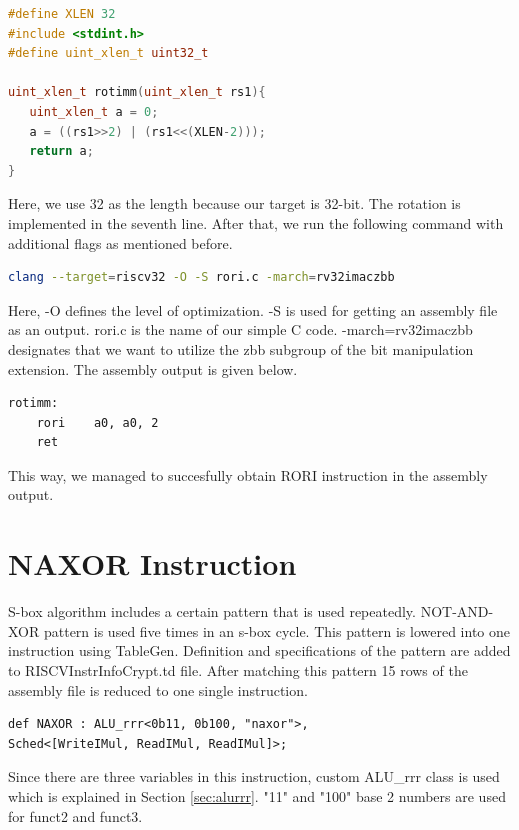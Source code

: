\begin{lstlisting}[language=C++]
#define XLEN 32
#include <stdint.h>
#define uint_xlen_t uint32_t

uint_xlen_t rotimm(uint_xlen_t rs1){
   uint_xlen_t a = 0;
   a = ((rs1>>2) | (rs1<<(XLEN-2)));
   return a;
}
\end{lstlisting}

Here, we use 32 as the length because our target is 32-bit. The rotation is implemented in the seventh line. After that, we run the following command with additional flags as mentioned before.

\begin{lstlisting}[language=Bash]
clang --target=riscv32 -O -S rori.c -march=rv32imaczbb
\end{lstlisting}

Here, -O defines the level of optimization. -S is used for getting an assembly file as an output. rori.c is the name of our simple C code. -march=rv32imaczbb designates that we want to utilize the zbb subgroup of the bit manipulation extension. The assembly output is given below.%

\begin{lstlisting}
rotimm:
	rori	a0, a0, 2
	ret
\end{lstlisting}

This way, we managed to succesfully obtain RORI instruction in the assembly output.

\section{NAXOR Instruction}\label{sec:naxor}

S-box algorithm includes a certain pattern that is used repeatedly. NOT-AND-XOR pattern is used five times in an s-box cycle. This pattern is lowered into one instruction using TableGen. Definition and specifications of the pattern are added to RISCVInstrInfoCrypt.td file. After matching this pattern 15 rows of the assembly file is reduced to one single instruction. 

\begin{lstlisting}
def NAXOR : ALU_rrr<0b11, 0b100, "naxor">,
Sched<[WriteIMul, ReadIMul, ReadIMul]>;
\end{lstlisting}

Since there are three variables in this instruction, custom ALU\_rrr class is used which is explained in Section \ref{sec:alurrr}. "11" and "100" base 2 numbers are used for funct2 and funct3.

